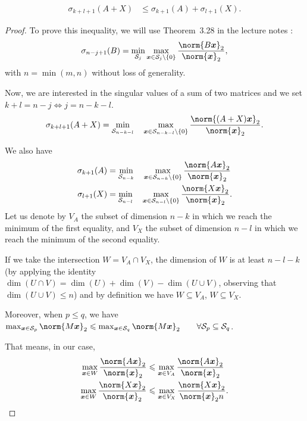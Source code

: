 \documentclass[11pt]{article}
\newcommand{\snorm}[1]{\norm{#1}_2} %
\begin{document}
\begin{align}
\sigma_{k+l + 1}(A+X)
&\leqslant \sigma_{k+1}(A) + \sigma_{l+1}(X).
\end{align}
\begin{proof}

To prove this inequality, we will use Theorem~3.28 in the lecture notes :
\[\sigma_{n - j + 1}(B) = \min_{\mathcal{S}_j} \max_{\bm{x} \in \mathcal{S}_j \setminus \{0\}} \frac{\snorm{B\bm{x}}}{\snorm{\bm{x}}},
\]
with $n =\min(m, n)$ without loss of generality.

Now, we are interested in the singular values of a sum of two matrices and we set $k+l = n-j \iff j = n-k-l$.
\[\sigma_{k+l + 1}(A+X) = \min_{\mathcal{S}_{n-k-l}} \quad \max_{\bm{x} \in \mathcal{S}_{n-k-l} \setminus \{0\}} \frac{\snorm{(A+X)\bm{x}}}{\snorm{\bm{x}}}.
\]

We also have
\begin{align*}
\sigma_{k+1}(A) &= \min_{\mathcal{S}_{n-k}} \quad \max_{\bm{x}\in \mathcal{S}_{n-k}\setminus\{0\}}\frac{\snorm{A\bm{x}}}{\snorm{\bm{x}}}\\
\sigma_{l+1}(X) &= \min_{\mathcal{S}_{n-l}} \quad \max_{\bm{x}\in \mathcal{S}_{n-l}\setminus\{0\}}\frac{\snorm{X\bm{x}}}{\snorm{\bm{x}}}.
\end{align*}
Let us denote by $V_A$ the subset of dimension $n-k$ in which we reach the minimum of the first equality, and $V_X$ the subset of dimension $n-l$ in which we reach the minimum of the second equality.

If we take the intersection $W = V_A \cap V_X$, the dimension of $W$ is at least $n-l-k$ (by applying the identity \(\dim(U \cap V) = \dim(U) + \dim(V) - \dim(U \cup V)\), observing that \(\dim(U \cup V) \leqslant n\)) and by definition we have $W \subseteq V_A$, $W \subseteq V_X$. 

Moreover, when $p\leqslant q$, we have $\max_{\bm{x} \in \mathcal{S}_p}\snorm{M\bm{x}} \leqslant \max_{\bm{x} \in \mathcal{S}_q}\snorm{M\bm{x}} \qquad \forall \mathcal{S}_p \subseteq \mathcal{S}_q$.

That means, in our case,
\begin{align*}
\max_{\bm{x} \in W}\frac{\snorm{A\bm{x}}}{\snorm{\bm{x}}} &\leqslant \max_{\bm{x} \in V_A}\frac{\snorm{A\bm{x}}}{\snorm{\bm{x}}}\\
\max_{\bm{x} \in W}\frac{\snorm{X\bm{x}}}{\snorm{\bm{x}}} &\leqslant \max_{\bm{x} \in V_X}\frac{\snorm{X\bm{x}}}{\snorm{\bm{x}}n}.
\end{align*}


\end{proof}
\end{document}
